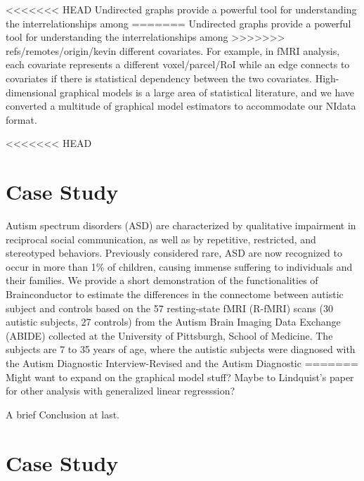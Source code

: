 \documentclass{nature}
\begin{document}
{<<<<<<< HEAD
Undirected graphs provide a powerful tool for understanding the interrelationships among
=======
Undirected graphs provide a powerful tool for understanding the
interrelationships among
>>>>>>> refs/remotes/origin/kevin
different covariates. For example, in fMRI analysis, each covariate represents 
a different voxel/parcel/RoI while an edge connects to covariates if there is
statistical dependency between the two covariates. High-dimensional graphical
models is a large area of statistical literature, and we have converted 
a multitude of graphical model estimators to accommodate our NIdata format.

<<<<<<< HEAD



\section{Case Study}

Autism spectrum disorders (ASD) are characterized by qualitative impairment in reciprocal social communication, as well as by repetitive, restricted, and stereotyped behaviors. Previously considered rare, ASD are now recognized to occur in more than 1\% of children, causing immense suffering to individuals and their families. 
We provide a short demonstration of the functionalities of Brainconductor to
estimate the differences in the connectome between autistic subject and controls based
on the 57 resting-state fMRI (R-fMRI) scans (30 autistic subjects, 27 controls) from the Autism
Brain Imaging Data Exchange (ABIDE) collected at the 
University of Pittsburgh, School of Medicine\cite{di2014autism}. 
The subjects are 7 to 35 years of age, where the autistic subjects were
diagnosed with the Autism Diagnostic Interview-Revised and the Autism Diagnostic 
=======
{\color{red}Might want to expand on the graphical model stuff? Maybe to Lindquist's
paper for other analysis with generalized linear regresssion?}


{\color{red}A brief Conclusion at last.}

\section{Case Study}

}
\end{document}
